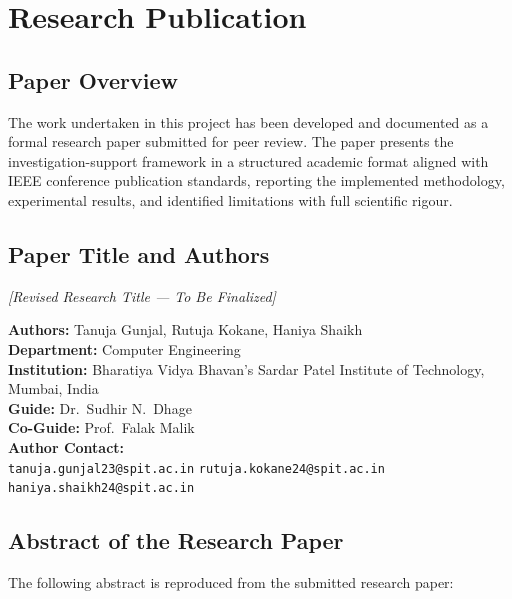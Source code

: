 \chapter{Research Publication}
\label{ch:publication}

\section{Paper Overview}

The work undertaken in this project has been developed and documented as a formal research paper submitted for peer review. The paper presents the investigation-support framework in a structured academic format aligned with IEEE conference publication standards, reporting the implemented methodology, experimental results, and identified limitations with full scientific rigour.

\section{Paper Title and Authors}

\begin{center}
\textit{[Revised Research Title --- To Be Finalized]}
\end{center}

\noindent\textbf{Authors:} Tanuja Gunjal, Rutuja Kokane, Haniya Shaikh \\
\textbf{Department:} Computer Engineering \\
\textbf{Institution:} Bharatiya Vidya Bhavan's Sardar Patel Institute of Technology, Mumbai, India \\
\textbf{Guide:} Dr.\ Sudhir N.\ Dhage \\
\textbf{Co-Guide:} Prof.\ Falak Malik \\[6pt]
\noindent\textbf{Author Contact:} \\
\texttt{tanuja.gunjal23@spit.ac.in} \quad \texttt{rutuja.kokane24@spit.ac.in} \quad \texttt{haniya.shaikh24@spit.ac.in}

\section{Abstract of the Research Paper}

The following abstract is reproduced from the submitted research paper:

